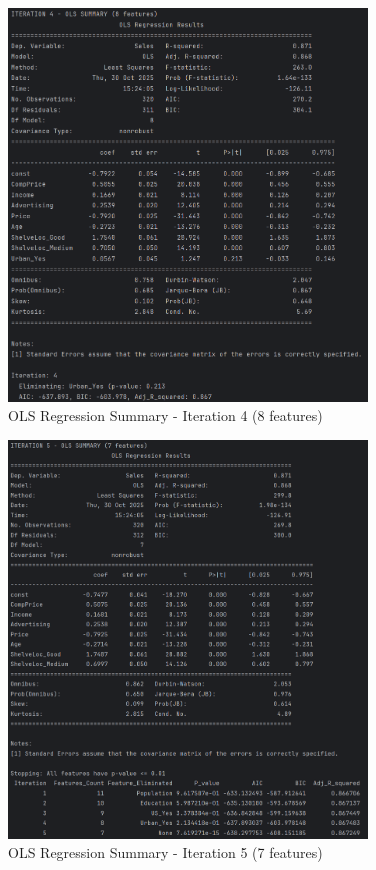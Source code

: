 \documentclass[12pt]{article}
\begin{document}
\begin{figure}[H]
    \centering
    \includegraphics[width=0.85\textwidth]{images/ols_summary_iter4.png}
    \caption{OLS Regression Summary - Iteration 4 (8 features)}
    \label{fig:ols_iter4}
\end{figure}

\begin{figure}[H]
    \centering
    \includegraphics[width=0.85\textwidth]{images/ols_summary_iter5.png}
    \caption{OLS Regression Summary - Iteration 5 (7 features)}
    \label{fig:ols_iter5}
\end{figure}
\end{document}
